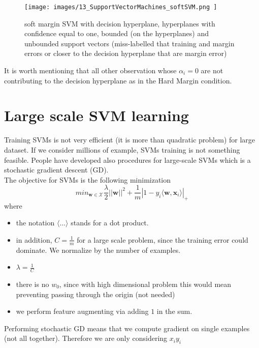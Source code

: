 \begin{figure}[H]
	\centering
	\texttt{[image: 
        images/13\_SupportVectorMachines\_softSVM.png
    ]}
	\caption{soft margin SVM with decision hyperplane, hyperplanes with confidence
	equal to one, bounded (on the hyperplanes) and unbounded support vectors (miss-labelled
	that training and margin errors or closer to the decision hyperplane that are margin
	error)}
	\label{fig:SVM_soft}
\end{figure}

It is worth mentioning that all other observation whose $\alpha_{i} = 0$ are not contributing 
to the decision hyperplane as in the Hard Margin condition.


\section{Large scale SVM learning}
Training SVMs is not very efficient (it is more than quadratic problem) for
large dataset. If we consider millions of example, SVMs training is not
something feasible. People have developed also procedures for large-scale SVMs which
is a stochastic gradient descent (GD).\\

The objective for SVMs is the following minimization
\[
	min_{\pmb{w} \in \mathcal{X}}\frac{\lambda}{2}||\pmb{w}||^{2}+ \frac{1}{m}|1 -
	y_{i}\langle \pmb{w}, \pmb{x}_{i}\rangle|_{+}
\]
where
\begin{itemize}
	\item the notation $\langle \dots \rangle$ stands for a dot product.

	\item in addition, $C = \frac{1}{m}$ for a large scale problem, since the training
		error could dominate. We normalize by the number of examples.

	\item $\lambda = \frac{1}{C}$

	\item there is no $w_{0}$, since with high dimensional problem this would mean
		preventing passing through the origin (not needed)

	\item we perform feature augmenting via adding $1$ in the sum.
\end{itemize}
Performing stochastic GD means that we compute gradient on single examples (not all
together). Therefore we are only considering $x_{i}y_{i}$

